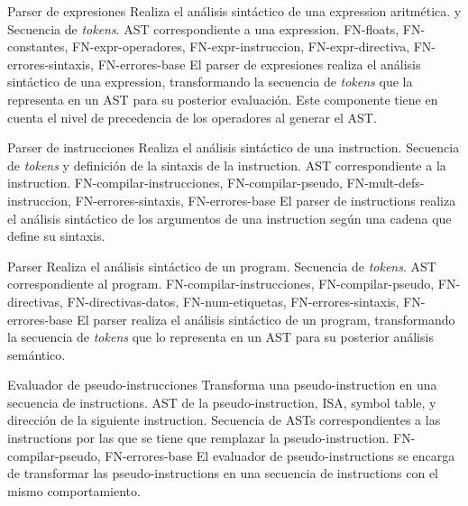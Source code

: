 \begin{component}{Parser de expresiones}
    {Realiza el análisis sintáctico de una \gls{expression} aritmética.} %
    { y } %
    {Secuencia de \textit{\glspl{token}}.} %
    {\gls{AST} correspondiente a una \gls{expression}.} %
    {FN-floats, FN-constantes, FN-expr-operadores,
    FN-expr-instruccion, FN-expr-directiva, FN-errores-sintaxis, FN-errores-base} %
    El \gls{parser} de expresiones realiza el análisis sintáctico de una
    \gls{expression}, transformando la secuencia de \textit{\glspl{token}} que la
    representa en un \gls{AST} para su posterior evaluación. Este componente
    tiene en cuenta el nivel de precedencia de los operadores al generar el
    \gls{AST}.
\end{component}

\begin{component}{Parser de instrucciones}
    {Realiza el análisis sintáctico de una \gls{instruction}.} %
    {} %
    {Secuencia de \textit{\glspl{token}} y definición de la sintaxis de la \gls{instruction}.} %
    {\gls{AST} correspondiente a la \gls{instruction}.} %
    {FN-compilar-instrucciones, FN-compilar-pseudo,
    FN-mult-defs-instruccion, FN-errores-sintaxis, FN-errores-base} %
    El \gls{parser} de \glspl{instruction} realiza el análisis sintáctico de los
    argumentos de una \gls{instruction} según una cadena que define su sintaxis.
\end{component}

\begin{component}{Parser}
    {Realiza el análisis sintáctico de un \gls{program}.} %
    {} %
    {Secuencia de \textit{\glspl{token}}.} %
    {\gls{AST} correspondiente al \gls{program}.} %
    {FN-compilar-instrucciones, FN-compilar-pseudo, FN-directivas,
    FN-directivas-datos, FN-num-etiquetas, FN-errores-sintaxis, FN-errores-base} %
    El \gls{parser} realiza el análisis sintáctico de un \gls{program},
    transformando la secuencia de \textit{\glspl{token}} que lo representa en un
    \gls{AST} para su posterior análisis semántico.
\end{component}

\begin{component}{Evaluador de pseudo-instrucciones}
    {Transforma una \gls{pseudo-instruction} en una secuencia de \glspl{instruction}.} %
    {} %
    {\gls{AST} de la \gls{pseudo-instruction}, \gls{ISA}, \gls{symbol table}, y dirección de la siguiente \gls{instruction}.} %
    {Secuencia de \glspl{AST} correspondientes a las \glspl{instruction} por las que se tiene que remplazar la \gls{pseudo-instruction}.} %
    {FN-compilar-pseudo, FN-errores-base} %
    El evaluador de \glspl{pseudo-instruction} se encarga de transformar las
    \glspl{pseudo-instruction} en una secuencia de \glspl{instruction} con el
    mismo comportamiento.
\end{component}

